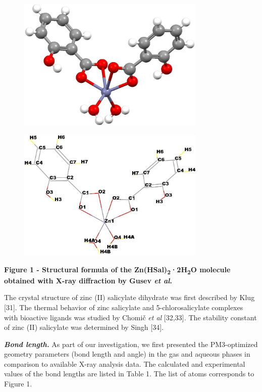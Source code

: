 \begin{figure}[H]
	\centering
	\includegraphics[width=0.8\textwidth]{assets/37}
	\caption*{}
\end{figure}\begin{figure}[H]
	\centering
	\includegraphics[width=0.8\textwidth]{assets/38}
	\caption*{}
\end{figure}

{\bfseries Figure 1 - Structural formula of the
Zn(HSal)\textsubscript{2}·2H\textsubscript{2}O molecule obtained with
X-ray diffraction by Gusev \emph{et al}.}

The crystal structure of zinc (II) salicylate dihydrate was first
described by Klug {[}31{]}. The thermal behavior of zinc salicylate and
5-chlorosalicylate complexes with bioactive ligands was studied by
Chomič \emph{et al} {[}32,33{]}\emph{.} The stability constant of zinc
(II) salicylate was determined by Singh {[}34{]}.

{\bfseries \emph{Bond length.}} As part of our investigation, we first
presented the PM3-optimized geometry parameters (bond length and angle)
in the gas and aqueous phases in comparison to available X-ray analysis
data. The calculated and experimental values \hspace{0pt}\hspace{0pt}of
the bond lengths are listed in Table 1. The list of atoms corresponds to
Figure 1.

